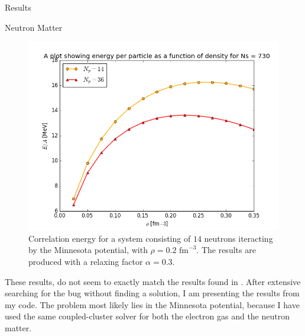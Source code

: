 \documentclass[twoside,english]{uiofysmaster}
\begin{document}
\begin{chapter}{Results}
\begin{section}{Neutron Matter}
\begin{figure}[]
      \label{figure:thermodynamic_limit}
    \end{figure}
    \begin{figure}[]
      \includegraphics[width=\textwidth]{../NuclearMatter/Results/Figures/Vary_rho_Nh14.png}
      \caption{Correlation energy for a system consisting of $14$ neutrons iteracting by the Minnesota potential, with $\rho=0.2\text{ fm}^{-3}$. The results are produced with a relaxing factor $\alpha=0.3$. }
      \label{figure:thermodynamic_limit}
    \end{figure}
    
    These results, do not seem to exactly match the results found in \cite{Hjorth-Jensen2016}. After extensive searching for the bug without finding a solution, I am presenting the results from my code. The problem most likely lies in the Minnesota potential, because I have used the same coupled-cluster solver for both the electron gas and the neutron matter. 
  \end{section}

\end{chapter}
\end{document}
